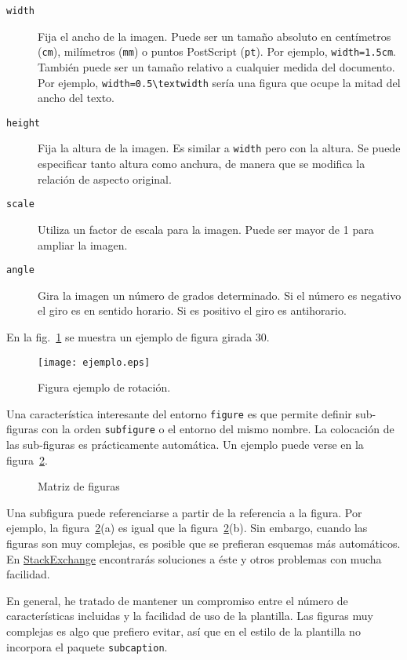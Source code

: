 \begin{description}
\item[\texttt{width}]  Fija el ancho de la imagen.  Puede ser un tamaño absoluto en centímetros (\texttt{cm}), milímetros (\texttt{mm}) o puntos PostScript (\texttt{pt}).  Por ejemplo,  \verb|width=1.5cm|.  También puede ser un tamaño relativo a cualquier medida del documento.  Por ejemplo, \verb|width=0.5\textwidth| sería una figura que ocupe la mitad del ancho del texto.

\item[\texttt{height}] Fija la altura de la imagen.  Es similar a \texttt{width} pero con la altura.  Se puede especificar tanto altura como anchura, de manera que se modifica la relación de aspecto original.

\item[\texttt{scale}] Utiliza un factor de escala para la imagen.  Puede ser mayor de 1 para ampliar la imagen.

\item[\texttt{angle}] Gira la imagen un número de grados determinado.  Si el número es negativo el giro es en sentido horario.  Si es positivo el giro es antihorario.
\end{description}


En la fig.~\ref{fig:figura-angulo-30} se muestra un ejemplo de figura girada 30.

\begin{figure}[btp]
\centering
\texttt{[image: ejemplo.eps]}
\caption{Figura ejemplo de rotación.}
\label{fig:figura-angulo-30}
\end{figure}

Una característica interesante del entorno \texttt{figure} es que permite definir sub-figuras con la orden \texttt{subfigure} o el entorno del mismo nombre.  La colocación de las sub-figuras es prácticamente automática.  Un ejemplo puede verse en la figura~\ref{fig:matriz-figuras}.

\begin{figure}[htbp]
\centering
{}
\caption{Matriz de figuras} 
\label{fig:matriz-figuras}
\end{figure}

Una subfigura puede referenciarse a partir de la referencia a la figura.  Por ejemplo, la figura~\ref{fig:matriz-figuras}(a) es igual que la figura~\ref{fig:matriz-figuras}(b). Sin embargo, cuando las figuras son muy complejas, es posible que se prefieran esquemas más automáticos.  En \href{https://tex.stackexchange.com/questions/181225/how-to-reference-to-subfigure-in-latex}{StackExchange} encontrarás soluciones a éste y otros problemas con mucha facilidad.

En general, he tratado de mantener un compromiso entre el número de características incluidas y la facilidad de uso de la plantilla.  Las figuras muy complejas es algo que prefiero evitar, así que en el estilo de la plantilla no incorpora el paquete \texttt{subcaption}.
